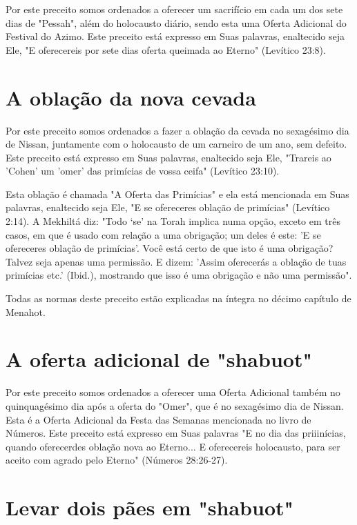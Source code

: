\begin{itemize}
\begin{enumrate}
\begin{itemize}
\begin{itemize}
Por este preceito somos ordenados a oferecer um sacrifício em cada um
dos sete dias de "Pessah", além do holocausto diário, sendo esta uma
Ofer­ta Adicional do Festival do Azimo. Este preceito está expresso em
Suas pala­vras, enaltecido seja Ele, "E oferecereis por sete dias oferta
queimada ao Eter­no" (Levítico 23:8).

\section{A oblação da nova cevada}

Por este preceito somos ordenados a fazer a oblação da cevada no
sexagésimo dia de Nissan, juntamente com o holocausto de um carneiro de
um ano, sem defeito. Este preceito está expresso em Suas palavras,
enaltecido seja Ele, "Trareis ao 'Cohen' um 'omer' das primícias de
vossa ceifa" (Levítico 23:10).

Esta oblação é chamada "A Oferta das Primícias" e ela está mencio­nada
em Suas palavras, enaltecido seja Ele, "E se ofereceres oblação de
primí­cias" (Levítico 2:14). A Mekhiltá diz: "Todo `se' na Torah implica
numa opção, exceto em três casos, em que é usado com relação a uma
obrigação; um deles é este: 'E se ofereceres oblação de primícias'. Você
está certo de que isto é uma obrigação? Talvez seja apenas uma
permissão. E dizem: 'Assim oferecerás a obla­ção de tuas primícias etc.'
(Ibid.), mostrando que isso é uma obrigação e não uma permissão".

Todas as normas deste preceito estão explicadas na íntegra no déci­mo
capítulo de Menahot.

\section{A oferta adicional de "shabuot"}

Por este preceito somos ordenados a oferecer uma Oferta Adicional também
no quinquagésimo dia após a oferta do "Omer", que é no sexagésimo dia de
Nissan. Esta é a Oferta Adicional da Festa das Semanas mencionada no
livro de Números. Este preceito está expresso em Suas palavras "E no dia
das priiinícias, quando oferecerdes oblação nova ao Eterno... E
oferecereis holocaus­to, para ser aceito com agrado pelo Eterno"
(Números 28:26-27).

\section{Levar dois pães em "shabuot"}


\end{itemize}
\end{itemize}
\end{enumrate}
\end{itemize}
